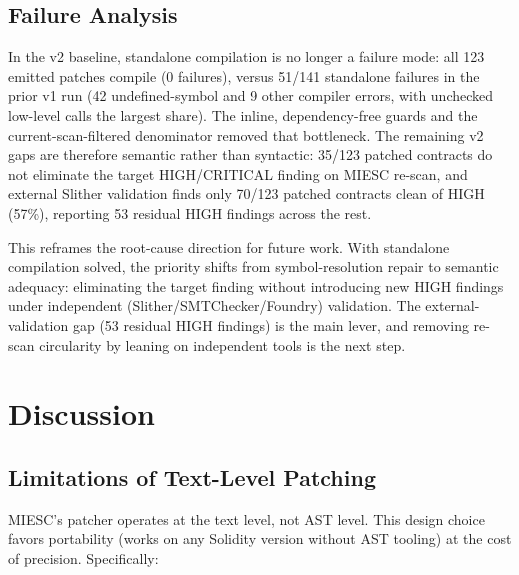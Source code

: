 \documentclass[conference]{IEEEtran}
\begin{document}
\subsection{Failure Analysis}

In the v2 baseline, standalone compilation is no longer a failure mode: all 123 emitted patches compile (0 failures), versus 51/141 standalone failures in the prior v1 run (42 undefined-symbol and 9 other compiler errors, with unchecked low-level calls the largest share). The inline, dependency-free guards and the current-scan-filtered denominator removed that bottleneck. The remaining v2 gaps are therefore semantic rather than syntactic: 35/123 patched contracts do not eliminate the target HIGH/CRITICAL finding on MIESC re-scan, and external Slither validation finds only 70/123 patched contracts clean of HIGH (57\%), reporting 53 residual HIGH findings across the rest.

This reframes the root-cause direction for future work. With standalone compilation solved, the priority shifts from symbol-resolution repair to semantic adequacy: eliminating the target finding without introducing new HIGH findings under independent (Slither/SMTChecker/Foundry) validation. The external-validation gap (53 residual HIGH findings) is the main lever, and removing re-scan circularity by leaning on independent tools is the next step.

\section{Discussion}

\subsection{Limitations of Text-Level Patching}

MIESC's patcher operates at the text level, not AST level. This design choice favors portability (works on any Solidity version without AST tooling) at the cost of precision. Specifically:
\end{document}
